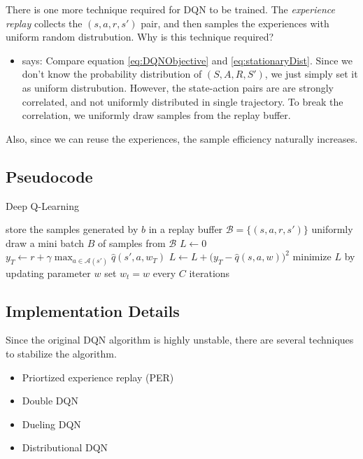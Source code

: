         There is one more technique required for DQN to be trained. The \emph{experience replay} collects the $(s, a, r, s')$ pair, and then
        samples the experiences with uniform random distrubution. Why is this technique required?
        
        \begin{itemize}
            \item \cite{Zhao2025} says: Compare equation \ref{eq:DQNObjective} and \ref{eq:stationaryDist}. Since we don't know the probability distribution of $(S, A, R, S')$,
                we just simply set it as uniform distrubution. However, the state-action pairs are are strongly correlated, and not uniformly distributed in single trajectory.
                To break the correlation, we uniformly draw samples from the replay buffer.
        \end{itemize}
        
        Also, since we can reuse the experiences, the sample efficiency naturally increases.
    \subsection{Pseudocode}
        {Deep Q-Learning}
        {
             \\
        }
        {}
        {
            store the samples generated by $b$ in a replay buffer $\mathcal{B} = \{(s, a, r, s')\}$\;
            {
                uniformly draw a mini batch $B$ of samples from $\mathcal{B}$\;
                $L \leftarrow 0$\;
                {
                    $y_T \leftarrow r + \gamma \max_{a \in \mathcal{A}(s')}{\hat{q}(s', a, w_T)}$\;
                    $L \leftarrow L + \Big( y_T - \hat{q}(s, a, w) \Big)^2$\;
                }
                minimize $L$ by updating parameter $w$\;
                set $w_t = w$ every $C$ iterations
            }
            
        }
    \subsection{Implementation Details}
        Since the original DQN algorithm is highly unstable, there are several techniques to stabilize the algorithm.
        \begin{itemize}
            \item Priortized experience replay (PER)
            \item Double DQN
            \item Dueling DQN
            \item Distributional DQN
        \end{itemize}
